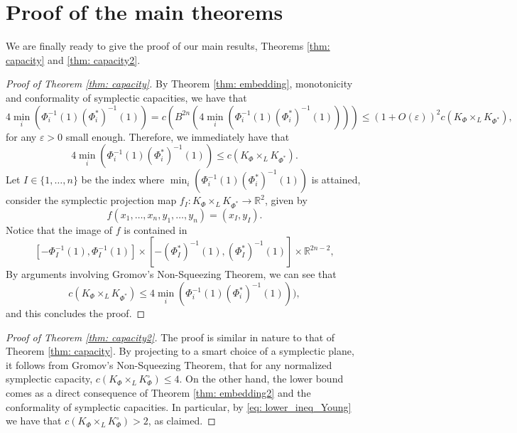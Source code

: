 \documentclass{article}
\theoremstyle{definition}
\begin{document}



\section{Proof of the main theorems}\label{sec: capacity}

We are finally ready to give the proof of our main results, Theorems \ref{thm: capacity} and \ref{thm: capacity2}.

\begin{proof}[Proof of Theorem \ref{thm: capacity}]
By Theorem \ref{thm: embedding}, monotonicity and conformality of symplectic capacities, we have that 
$$4\min_i(\Phi_i^{-1}(1){(\Phi^*_i)}^{-1}(1))=c(B^{2n}(4\min_i(\Phi_i^{-1}(1){(\Phi^*_i)}^{-1}(1))))\leq (1+O(\varepsilon))^2c(K_{\Phi}\times_L K_{\Phi^*}),$$
for any $\varepsilon>0$ small enough. Therefore, we immediately have that 
$$4\min_i(\Phi_i^{-1}(1){(\Phi^*_i)}^{-1}(1))\leq c(K_{\Phi}\times_L K_{\Phi^*}).$$
Let $I\in\{1,\ldots,n\}$ be the index where $\min_i(\Phi_i^{-1}(1){(\Phi^*_i)}^{-1}(1))$ is attained, consider the symplectic projection map $f_I:K_{\Phi}\times_L K_{\Phi^*}\to \mathbb{R}^2$, given by
$$f(x_1,\ldots,x_n,y_1,\ldots,y_n)=(x_I,y_I).$$
Notice that the image of $f$ is contained in 
\[
 [-\Phi_I^{-1}(1),\Phi_I^{-1}(1)]\times[-{(\Phi^*_I)}^{-1}(1),{(\Phi^*_I)}^{-1}(1)]\times \mathbb{R}^{2n-2},
\]
 By arguments involving Gromov's Non-Squeezing Theorem, we can see that 
$$c(K_{\Phi}\times_L K_{\Phi^*})\leq 4\min_i(\Phi_i^{-1}(1){(\Phi^*_i)}^{-1}(1))),$$
and this concludes the proof.
\end{proof}


\begin{proof}[Proof of Theorem \ref{thm: capacity2}]
The proof is similar in nature to that of Theorem \ref{thm: capacity}. By projecting to a smart choice of a symplectic plane, it follows from Gromov's Non-Squeezing Theorem, that for any normalized symplectic capacity, $c(K_{\Phi}\times_L K_{\Phi}^{\circ}) \leq 4$. On the other hand, the lower bound comes as a direct consequence of Theorem \ref{thm: embedding2} and the conformality of symplectic capacities. In particular, by \eqref{eq: lower_ineq_Young} we have that $ c(K_{\Phi}\times_L K_{\Phi}^{\circ})> 2$, as claimed.
\end{proof}
\end{document}
